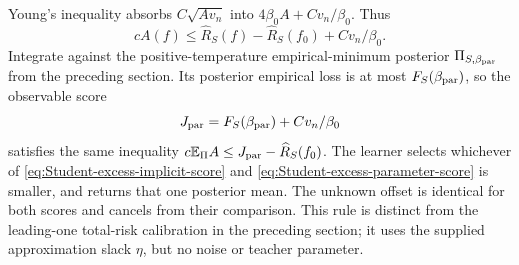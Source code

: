 Young's inequality absorbs $C\sqrt{A v_n}$ into $4\beta_0 A+C v_n/\beta_0$. Thus
\[
 cA(f)\le\widehat R_S(f)-\widehat R_S(f_0)+C v_n/\beta_0.
\]
Integrate against the positive-temperature empirical-minimum posterior $\Pi_{S,\beta_{\rm par}}$ from the preceding section. Its posterior empirical loss is at most $F_S(\beta_{\rm par})$, so the observable score
\begin{equation}
 J_{\rm par}=F_S(\beta_{\rm par})+C v_n/\beta_0
 \label{eq:Student-excess-parameter-score}
\end{equation}
satisfies the same inequality $c\mathbb E_\Pi A\le J_{\rm par}-\widehat R_S(f_0)$.
The learner selects whichever of \eqref{eq:Student-excess-implicit-score} and \eqref{eq:Student-excess-parameter-score} is smaller, and returns that one posterior mean. The unknown offset is identical for both scores and cancels from their comparison. This rule is distinct from the leading-one total-risk calibration in the preceding section; it uses the supplied approximation slack $\eta$, but no noise or teacher parameter.

